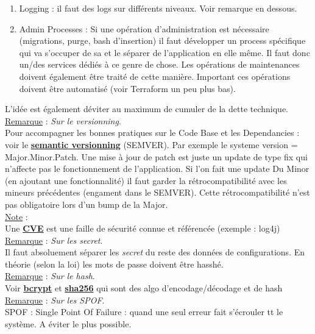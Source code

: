 \documentclass[a4paper,12pt,twoside]{article}
\newcommand{\urlcolor}{magenta}  %
\newcommand{\keycolor}{purple} %
\newcommand{\rem}[2]{\noindent\underline{Remarque} : \textit{#1}.\\ \indent #2}
\newcommand{\note}[1]{\noindent\underline{Note} : \\ \indent #1}
\newcommand{\keyref}[2]{\hypersetup{urlcolor=\keycolor} \href{#1}{\textbf{#2}}\hypersetup{urlcolor=\urlcolor}}
\begin{document}
{\begin{enumerate}
\item Logging : il faut des logs sur différents niveaux. Voir remarque en dessous.
\item Admin Processes : Si une opération d'administration est nécessaire (migrations, purge, bash d'insertion) il faut développer un process spécifique qui va s'occuper de sa et le séparer de l'application en elle même. Il faut donc un/des services dédiés à ce genre de chose. Les opérations de maintenances doivent également être traité de cette manière. Important ces opérations doivent être automatisé (voir Terraform un peu plus bas).\\
\end{enumerate}
}

L'idée est également déviter au maximum de cumuler de la dette technique.\\ 

\rem{Sur le versionning}{Pour accompagner les bonnes pratiques sur le Code Base et les Dependancies : voir le \keyref{https://semver.org/lang/fr/}{semantic versionning} (SEMVER). Par exemple le systeme version =  Major.Minor.Patch. Une mise à jour de patch est juste un update de type fix qui n'affecte pas le fonctionnement de l'application. Si l'on fait une update Du Minor (en ajoutant une fonctionnalité) il faut garder la rétrocompatibilité avec les mineurs précédentes (engament dans le SEMVER). Cette rétrocompatibilité n'est pas obligatoire lors d'un bump de la Major.}\\

\note{Une \keyref{https://cve.mitre.org/}{CVE} est une faille de sécurité connue et référencée (exemple : log4j)}\\

\rem{Sur les secret}{Il faut absoluement séparer les \textit{secret} du reste des données de configurations. En théorie (selon la loi) les mots de passe doivent être hasshé.}\\

\rem{Sur le hash}{Voir \keyref{https://www.bcrypt.fr/}{bcrypt} et \keyref{https://fr.wikipedia.org/wiki/SHA-2}{sha256} qui sont des algo d'encodage/décodage et de hash}\\

\rem{Sur les SPOF}{SPOF : Single Point Of Failure : quand une seul erreur fait s'écrouler tt le système. A éviter le plus possible.}\\
\end{document}
